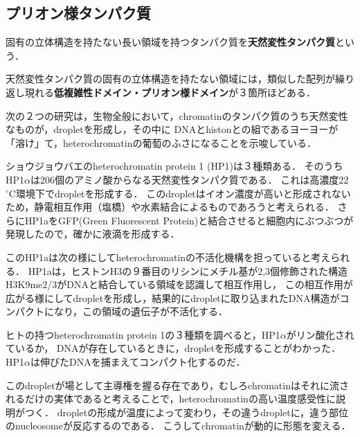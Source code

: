 \documentclass[uplatex, dvipdfmx]{jsreport}
\begin{document}
\subsection{プリオン様タンパク質}

\begin{definition}
    固有の立体構造を持たない長い領域を持つタンパク質を\textbf{天然変性タンパク質}という．
\end{definition}
\begin{definition}
    天然変性タンパク質の固有の立体構造を持たない領域には，類似した配列が繰り返し現れる\textbf{低複雑性ドメイン・プリオン様ドメイン}が３箇所ほどある．
\end{definition}
次の２つの研究は，生物全般において，chromatinのタンパク質のうち天然変性なものが，dropletを形成し，その中に
DNAとhistonとの組であるヨーヨーが「溶け」て，heterochromatinの葡萄のふさになることを示唆している．
\begin{example}\label{example-heterochromatin-and-HP1a}
    ショウジョウバエのheterochromatin protein 1 (HP1)は３種類ある．
    そのうちHP1$\alpha$は206個のアミノ酸からなる天然変性タンパク質である．
    これは高濃度22$^\circ\mathrm{C}$環境下でdropletを形成する\cite{HP1a}．
    このdropletはイオン濃度が高いと形成されないため，静電相互作用（塩橋）や水素結合によるものであろうと考えられる．
    さらにHP1aをGFP(Green Fluorescent Protein)と結合させると細胞内にぶつぶつが発現したので，確かに液滴を形成する．

    このHP1aは次の様にしてheterochromatinの不活化機構を担っていると考えられる．
    HP1aは，ヒストンH3の９番目のリシンにメチル基が2,3個修飾された構造H3K9me2/3がDNAと結合している領域を認識して相互作用し，
    この相互作用が広がる様にしてdropletを形成し，結果的にdropletに取り込まれたDNA構造がコンパクトになり，この領域の遺伝子が不活化する．
\end{example}
\begin{example}
    ヒトの持つheterochromatin protein 1の３種類を調べると，HP1$\alpha$がリン酸化されているか，
    DNAが存在しているときに，dropletを形成することがわかった\cite{HP1a-human}．
    HP1$\alpha$は伸びたDNAを捕まえてコンパクト化するのだ．
\end{example}

\begin{screen}
このdropletが場として主導権を握る存在であり，むしろchromatinはそれに流されるだけの実体であると考えることで，heterochromatinの高い温度感受性に説明がつく．
dropletの形成が温度によって変わり，その違うdropletに，違う部位のnucleosomeが反応するのである．
こうしてchromatinが動的に形態を変える．
\end{screen}
\end{document}
